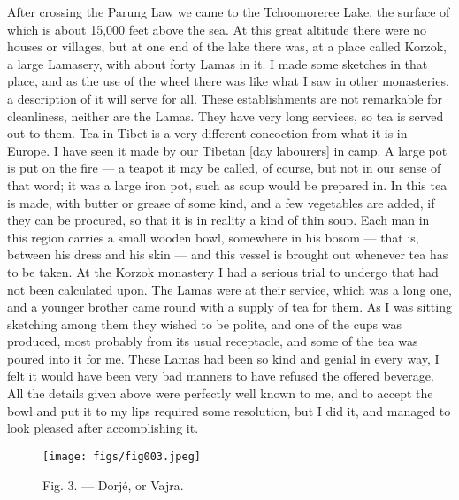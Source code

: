 \documentclass[a4paper, 11pt, oneside, polutonikogreek, english]{article}
\begin{document}
After crossing the Parung Law we came to the Tchoomoreree Lake, the surface of which is about 15,000 feet above the sea. At this great altitude there were no houses or villages, but at one end of the lake there was, at a place called Korzok, a large Lamasery, with about forty Lamas in it. I made some sketches in that place, and as the use of the wheel there was like what I saw in other monasteries, a description of it will serve for all. These establishments are not remarkable for cleanliness, neither are the Lamas. They have very long services, so tea is served out to them. Tea in Tibet is a very different concoction from what it is in Europe. I have seen it made by our Tibetan [day labourers] in camp. A large pot is put on the fire --- a teapot it may be called, of course, but not in our sense of that word; it was a large iron pot, such as soup would be prepared in. In this tea is made, with butter or grease of some kind, and a few vegetables are added, if they can be procured, so that it is in reality a kind of thin soup. Each man in this region carries a small wooden bowl, somewhere in his bosom --- that is, between his dress and his skin --- and this vessel is brought out whenever tea has to be taken. At the Korzok monastery I had a serious trial to undergo that had not been calculated upon. The Lamas were at their service, which was a long one, and a younger brother came round with a supply of tea for them. As I was sitting sketching among them they wished to be polite, and one of the cups was produced, most probably from its usual receptacle, and some of the tea was poured into it for me. These Lamas had been so kind and genial in every way, I felt it would have been very bad manners to have refused the offered beverage. All the details given above were perfectly well known to me, and to accept the bowl and put it to my lips required some resolution, but I did it, and managed to look pleased after accomplishing it.

\begin{figure}[H]
\centering
\texttt{[image: figs/fig003.jpeg]}
\caption{Fig. 3. --- Dorjé, or Vajra.}
\end{figure}
\end{document}
